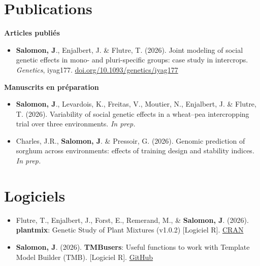 \documentclass[10pt,a4paper]{article}
\begin{document}
\section{Publications}
\textbf{Articles publiés}
\begin{itemize}[label=\textemdash]
  \item \textbf{Salomon, J}., Enjalbert, J. \& Flutre, T. (2026). Joint modeling of social genetic effects in mono- and pluri-specific groups: case study in intercrops. \textit{Genetics}, iyag177. \href{https://doi.org/10.1093/genetics/iyag177}{doi.org/10.1093/genetics/iyag177}
\end{itemize}
\bigskip
\textbf{Manuscrits en préparation}
\begin{itemize}[label=\textemdash, itemsep=6pt]
  \item \textbf{Salomon, J}., Levardois, K., Freitas, V., Moutier, N., Enjalbert, J. \& Flutre, T. (2026). Variability of social genetic effects in a wheat--pea intercropping trial over three environments. \textit{In prep.}
  \item Charles, J.R., \textbf{Salomon, J}. \& Pressoir, G. (2026). Genomic prediction of sorghum across environments: effects of training design and stability indices. \textit{In prep.}
\end{itemize}

\newpage
\section{Logiciels}
\begin{itemize}[label=\textemdash, itemsep=6pt]
  \item Flutre, T., Enjalbert, J., Forst, E., Remerand, M., \& \textbf{Salomon, J}. (2026). \textbf{plantmix}: Genetic Study of Plant Mixtures (v1.0.2) [Logiciel R]. \href{https://cran.r-project.org/web/packages/plantmix/index.html}{CRAN}
      \item \textbf{Salomon, J}. (2026). \textbf{TMBusers}: Useful functions to work with Template Model Builder (TMB). [Logiciel R]. \href{https://github.com/JemaySALOMON/TMBusers}{GitHub}
\end{itemize}

\end{document}
